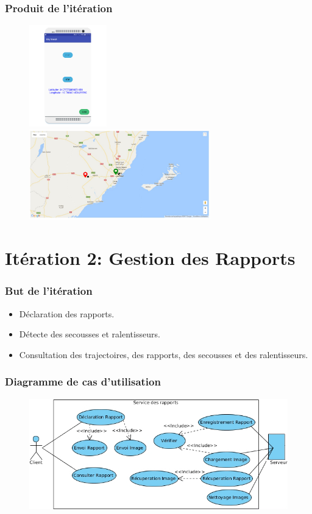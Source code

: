 \documentclass{beamer}
\begin{document}
\begin{frame}
    \frametitle{Produit de l'itération}
    \begin{figure}
        \includegraphics[width=0.3\textwidth]{./figures/sprint1-android-screenshot}
        \includegraphics[width=0.7\textwidth]{./figures/sprint1-dashboard-screenshot}
    \end{figure}
\end{frame}

\section{Itération 2: Gestion des Rapports}

\begin{frame}
    \frametitle{But de l'itération}
    \begin{itemize}
        \item<1-> Déclaration des rapports.
        \item<2-> Détecte des secousses et ralentisseurs.
        \item<3-> Consultation des trajectoires, des rapports, des secousses et des ralentisseurs.
    \end{itemize}
\end{frame}

\begin{frame}
    \frametitle{Diagramme de cas d'utilisation}
    \begin{figure}
        \includegraphics[width=\textwidth]{./diagrams/sprint2-webservices-report-usecase}
    \end{figure}
\end{frame}
\end{document}
